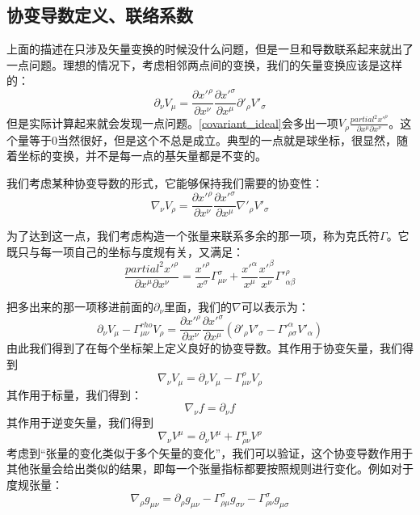 \documentclass[UTF-8]{article}
\begin{document}
\subsection{协变导数定义、联络系数}
上面的描述在只涉及矢量变换的时候没什么问题，但是一旦和导数联系起来就出了一点问题。理想的情况下，考虑相邻两点间的变换，我们的矢量变换应该是这样的：
\begin{equation}
	\partial_{\nu} V_{\mu} = \frac{\partial x'^{\rho}}{\partial x^{\nu}} \frac{\partial x'^{\sigma}}{\partial x^{\mu}} \partial'_{\rho} V'_{\sigma}
	\label{covariant_ideal}
\end{equation}
但是实际计算起来就会发现一点问题。\ref{covariant_ideal}会多出一项$V_{\rho}\frac{partial^2 x'^{\rho}}{\partial x^{\mu}\partial x^{\nu}}$。这个量等于0当然很好，但是这个不总是成立。典型的一点就是球坐标，很显然，随着坐标的变换，并不是每一点的基矢量都是不变的。

我们考虑某种协变导数的形式，它能够保持我们需要的协变性：
\begin{equation}
	\nabla_{\nu} V_{\rho} = \frac{\partial x'^{\rho}}{\partial x^{\nu}} \frac{\partial x'^{\sigma}}{\partial x^{\mu}} \nabla'_{\rho} V'_{\sigma}
	\label{covariant_target}
\end{equation}

为了达到这一点，我们考虑构造一个张量来联系多余的那一项，称为克氏符$\Gamma$。它既只与每一项自己的坐标与度规有关，又满足：
\begin{equation}
	\frac{partial^2 x'^{\rho}}{\partial x^{\mu}\partial x^{\nu}} = \frac{x'^{\rho}}{x^{\sigma}}\Gamma^{\sigma}_{ \mu\nu} + \frac{x'^{\alpha}}{x^{\mu}}\frac{x'^{\beta}}{x^{\nu}}\Gamma'^{\rho}_{ \alpha\beta}
\end{equation}

把多出来的那一项移进前面的$\partial_{\nu}$里面，我们的$\nabla$可以表示为：
\begin{equation}
	\partial_{\nu} V_{\mu} - \Gamma^{rho}_{ \mu\nu} V_{\rho}= \frac{\partial x'^{\rho}}{\partial x^{\nu}} \frac{\partial x'^{\sigma}}{\partial x^{\mu}} (\partial'_{\rho} V'_{\sigma}-\Gamma'^{\alpha}_{ \rho\sigma}V'_{\alpha})
\end{equation}
由此我们得到了在每个坐标架上定义良好的协变导数。其作用于协变矢量，我们得到
\begin{equation}
	\nabla_{\nu} V_{\mu} = \partial_{\nu} V_{\mu} - \Gamma^{\rho}_{ \mu\nu} V_{\rho}
\end{equation}
其作用于标量，我们得到：
\begin{equation}
	\nabla_{\nu} f = \partial_{\nu} f
\end{equation}
其作用于逆变矢量，我们得到
\begin{equation}
	\nabla_{\nu} V^{\mu} = \partial_{\nu} V^{\mu} + \Gamma^{\mu}_{ \rho\nu} V^{\rho}
\end{equation}
考虑到“张量的变化类似于多个矢量的变化”，我们可以验证，这个协变导数作用于其他张量会给出类似的结果，即每一个张量指标都要按照规则进行变化。例如对于度规张量：
\begin{equation}
	\nabla_{\rho} g_{\mu\nu} = \partial_{\rho} g_{\mu\nu} - \Gamma^{\sigma}_{ \rho\mu} g_{\sigma\nu} - \Gamma^{\sigma}_{ \rho\nu} g_{\mu\sigma}
\end{equation}
\end{document}
